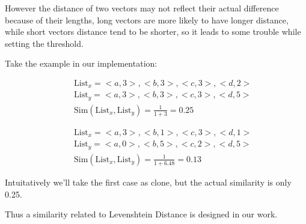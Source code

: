 \documentclass[../main.tex]{subfiles}
\begin{document}
However the distance of two vectors may not reflect their actual difference because of their lengths, long vectors are more likely to have longer distance, while short vectors distance tend to be shorter, so it leads to some trouble while setting the threshold. 

Take the example in our implementation:

\begin{eqnarray}\nonumber
&&\text{List}_x = {<a, 3>, <b, 3>, <c, 3>, <d, 2>}\\ \nonumber
&&\text{List}_y = {<a, 3>, <b, 3>, <c, 3>, <d, 5>} \\ 
&&\text{Sim}(\text{List}_x, \text{List}_y) = \frac{1}{1 + 3} = 0.25
\end{eqnarray}

\begin{eqnarray}\nonumber
&&\text{List}_x = {<a, 3>, <b, 1>, <c, 3>, <d, 1>}\\ \nonumber
&&\text{List}_y = {<a, 0>, <b, 5>, <c, 2>, <d, 5>} \\ 
&&\text{Sim}(\text{List}_x, \text{List}_y) = \frac{1}{1 + 6.48} = 0.13
\end{eqnarray}

Intuitatively we'll take the first case as clone, but the actual similarity is only 0.25.

Thus a similarity related to  Levenshtein Distance is designed in our work.



\end{document}
